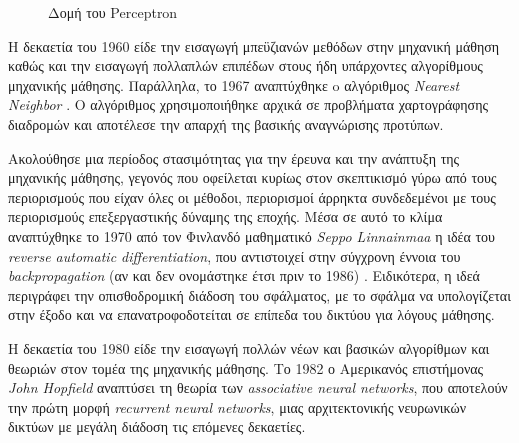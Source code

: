 \begin{figure}[h]
    \centering
    \caption{Δομή του Perceptron}
    \label{fig: Δομή του Perceptron}
\end{figure}

\medskip
Η δεκαετία του 1960 είδε την εισαγωγή μπεϋζιανών μεθόδων στην μηχανική μάθηση καθώς και την εισαγωγή πολλαπλών επιπέδων στους ήδη υπάρχοντες αλγορίθμους μηχανικής μάθησης. Παράλληλα, το 1967 αναπτύχθηκε o αλγόριθμος \textit{Nearest Neighbor} \cite{Cover1967}. Ο αλγόριθμος χρησιμοποιήθηκε αρχικά σε προβλήματα χαρτογράφησης διαδρομών και αποτέλεσε την απαρχή της βασικής αναγνώρισης προτύπων.

\medskip
Ακολούθησε μια περίοδος στασιμότητας για την έρευνα και την ανάπτυξη της μηχανικής μάθησης, γεγονός που οφείλεται κυρίως στον σκεπτικισμό γύρω από τους περιορισμούς που είχαν όλες οι μέθοδοι, περιορισμοί άρρηκτα συνδεδεμένοι με τους περιορισμούς επεξεργαστικής δύναμης της εποχής. Μέσα σε αυτό το κλίμα αναπτύχθηκε το 1970 από τον Φινλανδό μαθηματικό \textit{Seppo Linnainmaa} η ιδέα του \textit{reverse automatic differentiation}, που αντιστοιχεί στην σύγχρονη έννοια του \textit{backpropagation} (αν και δεν ονομάστηκε έτσι πριν το 1986) \cite{Linnainmaa1976}. Ειδικότερα, η ιδεά περιγράφει την οπισθοδρομική διάδοση του σφάλματος, με το σφάλμα να υπολογίζεται στην έξοδο και να επανατροφοδοτείται σε επίπεδα του δικτύου για λόγους μάθησης.

\medskip
Η δεκαετία του 1980 είδε την εισαγωγή πολλών νέων και βασικών αλγορίθμων και θεωριών στον τομέα της μηχανικής μάθησης. Το 1982 ο Αμερικανός επιστήμονας \textit{John Hopfield} αναπτύσει τη θεωρία των \textit{associative neural networks}, που αποτελούν την πρώτη μορφή \textit{recurrent neural networks}, μιας αρχιτεκτονικής νευρωνικών δικτύων με μεγάλη διάδοση τις επόμενες δεκαετίες. 

